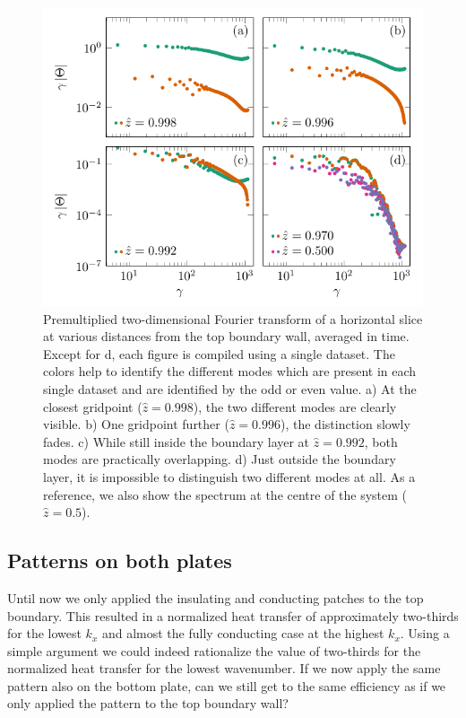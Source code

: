 \begin{figure}
\centering
\includegraphics{fig7.pdf}
\caption{%
Premultiplied two-dimensional Fourier transform of a horizontal slice at
various distances from the top boundary wall, averaged in time.  Except
for d, each figure is compiled using a single dataset.
The colors help to identify the different modes which are present in each
single dataset and are identified by the odd or even value.  a) At the closest
gridpoint ($\hat{z}=0.998$), the two different modes are clearly visible.  b)
One gridpoint further ($\hat{z}=0.996$), the distinction slowly fades.  c)
While still inside the boundary layer at $\hat{z}=0.992$, both modes are
practically overlapping.  d) Just outside the boundary layer, it is impossible
to distinguish two different modes at all.  As a reference, we also show the
spectrum at the centre of the system ($\hat{z}=0.5$).  }
\label{figure7}
\end{figure}

%
\subsection{Patterns on both plates}\label{BothPlates}
Until now we only applied the insulating and conducting patches to the top
boundary.  This resulted in a normalized heat transfer of approximately
two-thirds for the lowest $k_x$ and almost the fully conducting case at the
highest $k_x$.  Using a simple argument we could indeed rationalize the value
of two-thirds for the normalized heat transfer for the lowest wavenumber.  If
we now apply the same pattern also on the bottom plate, can we still get to
the same efficiency as if we only applied the pattern to the top boundary
wall?


